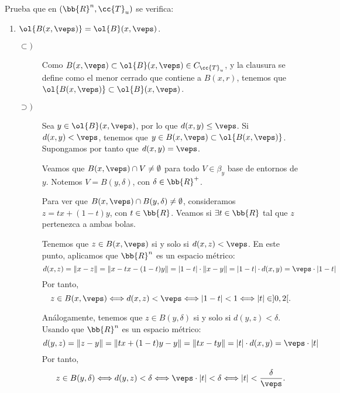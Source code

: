 \begin{ejercicio}
    Prueba que en $(\bb{R}^n, \cc{T}_u)$ se verifica:
    \begin{enumerate}[label=\alph*)]
        \item $\ol{B(x,\veps)} = \ol{B}(x,\veps)$.

        \begin{description}
            \item[$\subset)$] 
            Como $B(x,\veps)\subset \ol{B}(x,\veps)\in C_{\cc{T}_u}$, y la clausura se define como el menor cerrado que contiene a $B(x,r)$, tenemos que $\ol{B(x,\veps)} \subset \ol{B}(x,\veps)$.
            
            \item[$\supset)$] Sea $y\in \ol{B}(x,\veps)$, por lo que $d(x,y)\leq \veps$. Si $d(x,y)<\veps$, tenemos que $y\in B(x,\veps)\subset \ol{B(x,\veps)}$. Supongamos por tanto que $d(x,y)=\veps$.

            Veamos que $B(x,\veps)\cap V\neq \emptyset$ para todo $V\in \beta_y$ base de entornos de $y$. Notemos $V=B(y,\delta)$, con $\delta\in \bb{R}^+$.

            Para ver que $B(x,\veps)\cap B(y,\delta)\neq \emptyset$, consideramos $z=tx+(1-t)y$, con $t\in \bb{R}$. Veamos si $\exists t\in \bb{R}$ tal que $z$ pertenezca a ambas bolas.

            Tenemos que $z\in B(x,\veps)$ si y solo si $d(x,z)<\veps$. En este punto, aplicamos que $\bb{R}^n$ es un espacio métrico:
            \begin{equation*}
                d(x,z)=\|x-z\|=\|x-tx-(1-t)y\| = |1-t|\cdot \|x-y\|=|1-t|\cdot d(x,y)=\veps\cdot |1-t|
            \end{equation*}
            Por tanto, 
            \begin{equation*}
                z\in B(x,\veps) \Longleftrightarrow d(x,z)<\veps
                \Longleftrightarrow |1-t|<1 \Longleftrightarrow |t|\in ]0,2[.
            \end{equation*}

            Análogamente, tenemos que $z\in B(y,\delta)$ si y solo si $d(y,z)<\delta$. Usando que $\bb{R}^n$ es un espacio métrico:
            \begin{equation*}
                d(y,z)=\|z-y\|=\|tx+(1-t)y-y\|=\|tx-ty\| = |t|\cdot d(x,y)=\veps\cdot |t|
            \end{equation*}
            Por tanto, 
            \begin{equation*}
                z\in B(y,\delta) \Longleftrightarrow d(y,z)<\delta
                \Longleftrightarrow \veps\cdot |t|<\delta \Longleftrightarrow |t|<\frac{\delta}{\veps}.
            \end{equation*}


\end{description}
\end{enumerate}
\end{ejercicio}
